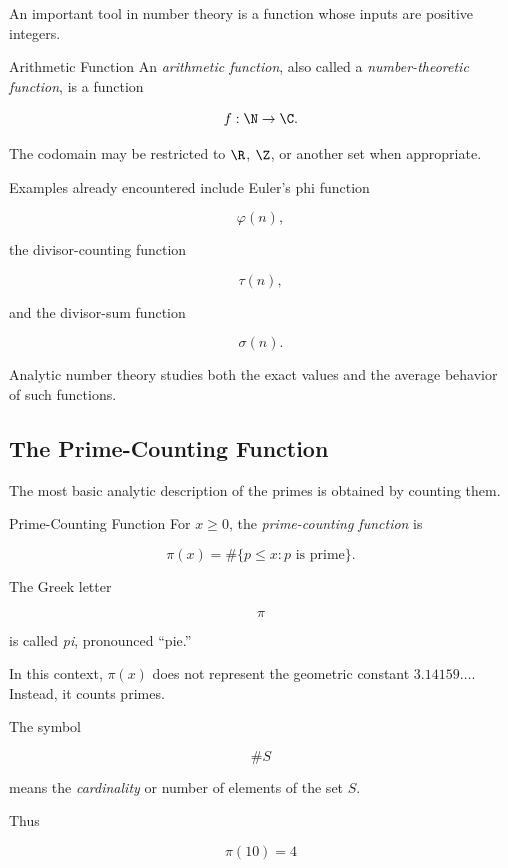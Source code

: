 An important tool in number theory is a function whose inputs are positive
integers.

\begin{definitionbox}{Arithmetic Function}
An \emph{arithmetic function}, also called a \emph{number-theoretic
function}, is a function

\[ f:\N\to\C. \]
\end{definitionbox}

The codomain may be restricted to \(\R\), \(\Z\), or another set when
appropriate.

Examples already encountered include Euler's phi function

\[ \varphi(n), \]

the divisor-counting function

\[ \tau(n), \]

and the divisor-sum function

\[ \sigma(n). \]

Analytic number theory studies both the exact values and the average behavior
of such functions.

\subsection{The Prime-Counting Function}
\label{subsec:prime-counting-function}

The most basic analytic description of the primes is obtained by counting
them.

\begin{definitionbox}{Prime-Counting Function}
For \(x\geq0\), the \emph{prime-counting function} is

\[ \pi(x)=\#\{p\leq x:p\text{ is prime}\}. \]
\end{definitionbox}

The Greek letter

\[ \pi \]

is called \emph{pi}, pronounced ``pie.''

In this context, \(\pi(x)\) does not represent the geometric constant
\(3.14159\ldots\). Instead, it counts primes.

The symbol

\[ \#S \]

means the \emph{cardinality} or number of elements of the set \(S\).

Thus

\[ \pi(10)=4 \]

